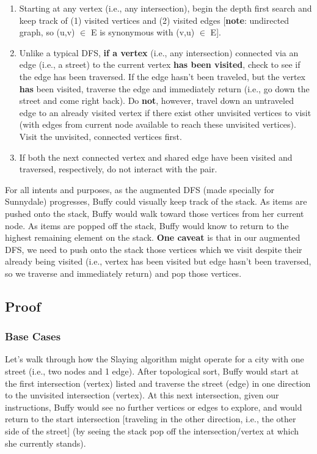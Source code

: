 \documentclass[conference]{styles/acmsiggraph}
\newcommand{\?}{\stackrel{?}{=}}
\begin{document}
\begin{enumerate}
    \item Starting at any vertex (i.e., any intersection), begin the depth first search and keep track of (1) visited vertices and (2) visited edges [\textbf{note}: undirected graph, so (u,v) $\in$ E is synonymous with (v,u) $\in$ E].
    \item Unlike a typical DFS, \textbf{if a vertex} (i.e., any intersection) connected via an edge (i.e., a street) to the current vertex \textbf{has been visited}, check to see if the edge has been traversed.  If the edge hasn't been traveled, but the vertex \textbf{has} been visited, traverse the edge and immediately return (i.e., go down the street and come right back).  Do \textbf{not}, however, travel down an untraveled edge to an already visited vertex if there exist other unvisited vertices to visit (with edges from current node available to reach these unvisited vertices).  Visit the unvisited, connected vertices first.
    \item If both the next connected vertex and shared edge have been visited and traversed, respectively, do not interact with the pair.
\end{enumerate}

For all intents and purposes, as the augmented DFS (made specially for Sunnydale) progresses, Buffy could visually keep track of the stack.  As items are pushed onto the stack, Buffy would walk toward those vertices from her current node.  As items are popped off the stack, Buffy would know to return to the highest remaining element on the stack.  \textbf{One caveat} is that in our augmented DFS, we need to push onto the stack those vertices which we visit despite their already being visited (i.e., vertex has been visited but edge hasn't been traversed, so we traverse and immediately return) and pop those vertices.

\subsection{Proof}
\subsubsection{Base Cases}
Let's walk through how the Slaying algorithm might operate for a city with one street (i.e., two nodes and 1 edge).  After topological sort, Buffy would start at the first intersection (vertex) listed and traverse the street (edge) in one direction to the unvisited intersection (vertex).  At this next intersection, given our instructions, Buffy would see no further vertices or edges to explore, and would return to the start intersection [traveling in the other direction, i.e., the other side of the street] (by seeing the stack pop off the intersection/vertex at which she currently stands). \\
\end{document}
